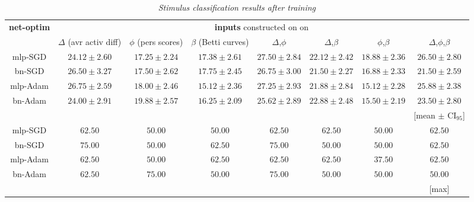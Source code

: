 

\begin{table}[h!]
    \label{table:1}
    \centering

\footnotesize
\begin{tabular}{cccccccc}
    \toprule
    \textbf{net-optim} & \multicolumn{7}{c}{\textbf{inputs} constructed on on} \\ \cmidrule{2-8}
    {} & $\Delta$ (avr activ diff) & $\phi$ (pers scores) & $\beta$ (Betti curves) & $\Delta$,$\phi$ & $\Delta$,$\beta$ & $\phi$,$\beta$ &   $\Delta$,$\phi$,$\beta$ \\
    \hline
        mlp-SGD    &           $24.12 \pm 2.60$ &           $17.25 \pm 2.24$ &           $17.38 \pm 2.61$ &  $\mathbf{27.50 \pm 2.84}$ &           $22.12 \pm 2.42$ &  $\mathbf{18.88 \pm 2.36}$ &  $\mathbf{26.50 \pm 2.80}$ \\
        bn-SGD  &           $26.50 \pm 3.27$ &           $17.50 \pm 2.62$ &  $\mathbf{17.75 \pm 2.45}$ &           $26.75 \pm 3.00$ &           $21.50 \pm 2.27$ &           $16.88 \pm 2.33$ &           $21.50 \pm 2.59$ \\
        mlp-Adam   &  $\mathbf{26.75 \pm 2.59}$ &           $18.00 \pm 2.46$ &           $15.12 \pm 2.36$ &           $27.25 \pm 2.93$ &           $21.88 \pm 2.84$ &           $15.12 \pm 2.28$ &           $25.88 \pm 2.38$ \\
        bn-Adam &           $24.00 \pm 2.91$ &  $\mathbf{19.88 \pm 2.57}$ &           $16.25 \pm 2.09$ &           $25.62 \pm 2.89$ &  $\mathbf{22.88 \pm 2.48}$ &           $15.50 \pm 2.19$ &           $23.50 \pm 2.80$ \\
        & & & & & & & [mean $\pm$ CI$_{95}$] \\
    \hline
        mlp-SGD    &           $62.50$ &           $50.00$ &           $50.00$ &           $62.50$ &  $\mathbf{62.50}$ &   $\mathbf{50.00}$ &         $\mathbf{62.50}$ \\
        bn-SGD  &  $\mathbf{75.00}$ &           $50.00$ &  $\mathbf{62.50}$ &  $\mathbf{75.00}$ &           $50.00$ &            $50.00$ &                  $62.50$ \\
        mlp-Adam   &           $62.50$ &           $50.00$ &           $62.50$ &           $62.50$ &           $62.50$ &            $37.50$ &                  $62.50$ \\
        bn-Adam &           $62.50$ &  $\mathbf{75.00}$ &           $50.00$ &           $75.00$ &           $50.00$ &            $50.00$ &                  $50.00$ \\
        & & & & & & & [max] \\
    \bottomrule
\end{tabular}
\normalsize

\caption{\textit{Stimulus classification results after training}}

\end{table}